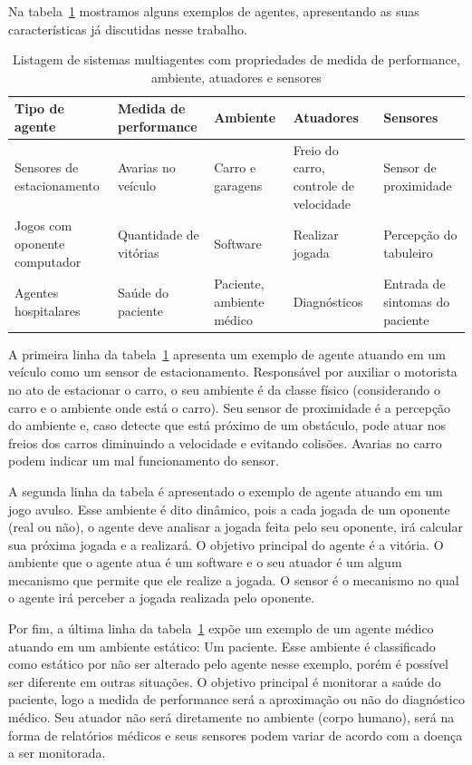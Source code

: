 Na tabela~\ref{lista_agentes} mostramos alguns exemplos de agentes, apresentando as suas características já discutidas nesse trabalho.

\begin{table}
	\caption{Listagem de sistemas multiagentes com propriedades de medida de performance, ambiente, atuadores e sensores}
	\begin{tabular}{|p{3cm} | p{3cm} | p{2cm}| p{3cm} | p{3cm} |}
		\hline
		\textbf{Tipo de agente}	& \textbf{Medida de performance} & \textbf{Ambiente} & \textbf{Atuadores}  & \textbf{Sensores}	\\
		\hline
		Sensores de estacionamento	& Avarias no veículo & Carro e garagens & Freio do carro, controle de velocidade & Sensor de proximidade	\\
		\hline
		Jogos com oponente computador	& Quantidade de vitórias &	Software & Realizar jogada & Percepção do tabuleiro	\\
		\hline
		Agentes hospitalares		& Saúde do paciente & Paciente, ambiente médico & Diagnósticos & Entrada de sintomas do paciente	\\
		\hline
	\end{tabular}
	\label{lista_agentes}
\end{table}
 
A primeira linha da tabela~\ref{lista_agentes} apresenta um exemplo de agente atuando em um veículo como um sensor de estacionamento. Responsável por auxiliar o motorista no ato de estacionar o carro, o seu ambiente é da classe físico (considerando o carro e o ambiente onde está o carro). Seu sensor de proximidade é a percepção do ambiente e, caso detecte que está próximo de um obstáculo, pode atuar nos freios dos carros diminuindo a velocidade e evitando colisões. Avarias no carro podem indicar um mal funcionamento do sensor.

A segunda linha da tabela é apresentado o exemplo de agente atuando em um jogo avulso. Esse ambiente é dito dinâmico, pois a cada jogada de um oponente (real ou não), o agente deve analisar a jogada feita pelo seu oponente, irá calcular sua próxima jogada e a realizará. O objetivo principal do agente é a vitória. O ambiente que o agente atua é um software e o seu atuador é um algum mecanismo que permite que ele realize a jogada. O sensor é o mecanismo no qual o agente irá perceber a jogada realizada pelo oponente.

Por fim, a última linha da tabela~\ref{lista_agentes} expõe um exemplo de um agente médico atuando em um ambiente estático: Um paciente. Esse ambiente é classificado como estático por não ser alterado pelo agente nesse exemplo, porém é possível ser diferente em outras situações. O objetivo principal é monitorar a saúde do paciente, logo a medida de performance será a aproximação ou não do diagnóstico médico. Seu atuador não será diretamente no ambiente (corpo humano), será na forma de relatórios médicos e seus sensores podem variar de acordo com a doença a ser monitorada.

